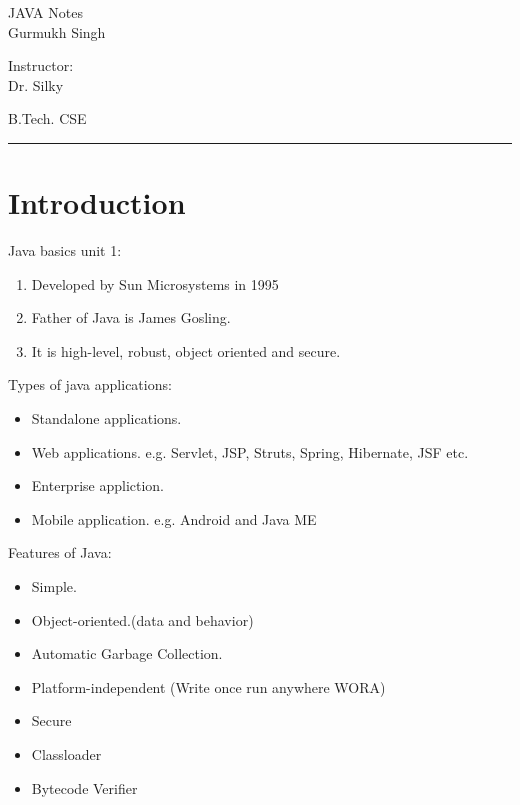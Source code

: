 \documentclass[11pt,letterpaper]{article}
\begin{document}
\begin{center}
  \Huge{JAVA Notes}\\
  \vspace{0.25cm}
  \small{Gurmukh Singh}
\end{center}

\vspace{-1.75cm}

\begin{flushright}
  Instructor: \\ Dr. Silky
\end{flushright}

\vspace{-1.3cm}

\begin{flushleft}
  B.Tech. CSE
\end{flushleft}

\rule{15.5cm}{0.1mm}%

\tableofcontents
\pagebreak


\section{Introduction}
Java basics unit 1:
\begin{enumerate}
  \item Developed by Sun Microsystems in 1995
  \item Father of Java is James Gosling.
  \item It is high-level, robust, object oriented and secure. 
\end{enumerate}
Types of java applications:
\begin{itemize}
  \item Standalone applications. 
  \item Web applications. e.g. Servlet, JSP, Struts, Spring, Hibernate, JSF etc.
  \item Enterprise appliction. 
  \item Mobile application. e.g. Android and Java ME
\end{itemize}
Features of Java:
\begin{itemize}
  \item Simple.
  \item Object-oriented.(data and behavior)
  \item Automatic Garbage Collection.
  \item Platform-independent (Write once run anywhere WORA)
  \item Secure 
  \item Classloader
  \item Bytecode Verifier
\end{itemize}
\end{document}
